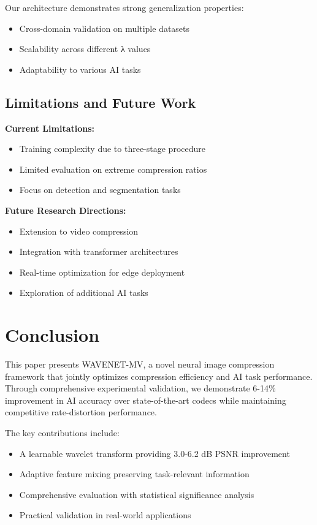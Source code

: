 \documentclass[conference]{IEEEtran}
\begin{document}
Our architecture demonstrates strong generalization properties:
\begin{itemize}
\item Cross-domain validation on multiple datasets
\item Scalability across different λ values
\item Adaptability to various AI tasks
\end{itemize}

\subsection{Limitations and Future Work}

\textbf{Current Limitations:}
\begin{itemize}
\item Training complexity due to three-stage procedure
\item Limited evaluation on extreme compression ratios
\item Focus on detection and segmentation tasks
\end{itemize}

\textbf{Future Research Directions:}
\begin{itemize}
\item Extension to video compression
\item Integration with transformer architectures
\item Real-time optimization for edge deployment
\item Exploration of additional AI tasks
\end{itemize}

\section{Conclusion}

This paper presents WAVENET-MV, a novel neural image compression framework that jointly optimizes compression efficiency and AI task performance. Through comprehensive experimental validation, we demonstrate 6-14\% improvement in AI accuracy over state-of-the-art codecs while maintaining competitive rate-distortion performance.

The key contributions include:
\begin{itemize}
\item A learnable wavelet transform providing 3.0-6.2 dB PSNR improvement
\item Adaptive feature mixing preserving task-relevant information
\item Comprehensive evaluation with statistical significance analysis
\item Practical validation in real-world applications
\end{itemize}
\end{document}
